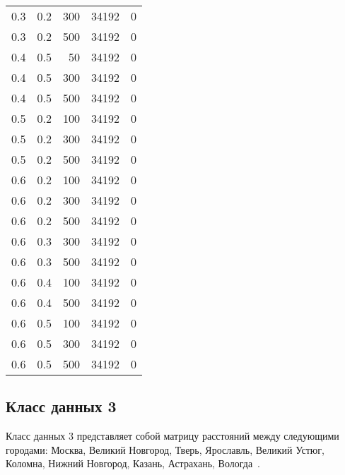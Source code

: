 \begin{center}
\begin{longtable}[c]{|r|r|r|r|r|}
		0.3 &  0.2 &  300 & 34192 &     0 \\
		0.3 &  0.2 &  500 & 34192 &     0 \\ \hline
		0.4 &  0.5 &   50 & 34192 &     0 \\
		0.4 &  0.5 &  300 & 34192 &     0 \\
		0.4 &  0.5 &  500 & 34192 &     0 \\ \hline
		0.5 &  0.2 &  100 & 34192 &     0 \\
		0.5 &  0.2 &  300 & 34192 &     0 \\
		0.5 &  0.2 &  500 & 34192 &     0 \\ \hline
		0.6 &  0.2 &  100 & 34192 &     0 \\
		0.6 &  0.2 &  300 & 34192 &     0 \\
		0.6 &  0.2 &  500 & 34192 &     0 \\ \hline
		0.6 &  0.3 &  300 & 34192 &     0 \\
		0.6 &  0.3 &  500 & 34192 &     0 \\ \hline
		0.6 &  0.4 &  100 & 34192 &     0 \\
		0.6 &  0.4 &  500 & 34192 &     0 \\ \hline
		0.6 &  0.5 &  100 & 34192 &     0 \\
		0.6 &  0.5 &  300 & 34192 &     0 \\
		0.6 &  0.5 &  500 & 34192 &     0 \\ \hline
	\end{longtable}
\end{center}

\subsection{Класс данных 3}
\label{par:class3}

Класс данных 3 представляет собой матрицу расстояний между следующими городами: Москва, Великий Новгород, Тверь, Ярославль, Великий Устюг, Коломна, Нижний Новгород, Казань, Астрахань, Вологда~\cite{map}.

